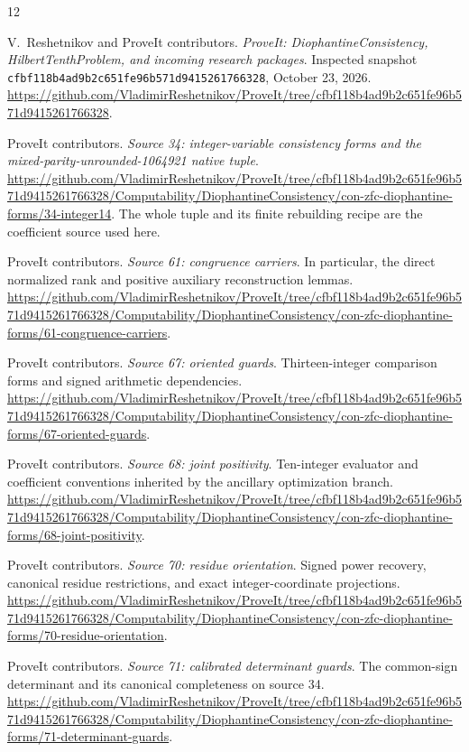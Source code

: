 \documentclass[11pt]{article}
\theoremstyle{definition}
\theoremstyle{remark}
\newcommand{\pin}{\nolinkurl{cfbf118b4ad9b2c651fe96b571d9415261766328}}
\begin{document}
\begin{thebibliography}{12}
\raggedright

V.~Reshetnikov and ProveIt contributors.
\emph{ProveIt: DiophantineConsistency, HilbertTenthProblem, and incoming
research packages}. Inspected snapshot
\pin, October 23, 2026.
\url{https://github.com/VladimirReshetnikov/ProveIt/tree/cfbf118b4ad9b2c651fe96b571d9415261766328}.

ProveIt contributors.
\emph{Source 34: integer-variable consistency forms and the
mixed-parity-unrounded-1064921 native tuple}.
\url{https://github.com/VladimirReshetnikov/ProveIt/tree/cfbf118b4ad9b2c651fe96b571d9415261766328/Computability/DiophantineConsistency/con-zfc-diophantine-forms/34-integer14}.
The whole tuple and its finite rebuilding recipe are the coefficient
source used here.

ProveIt contributors.
\emph{Source 61: congruence carriers}.
In particular, the direct normalized rank and positive auxiliary
reconstruction lemmas.
\url{https://github.com/VladimirReshetnikov/ProveIt/tree/cfbf118b4ad9b2c651fe96b571d9415261766328/Computability/DiophantineConsistency/con-zfc-diophantine-forms/61-congruence-carriers}.

ProveIt contributors.
\emph{Source 67: oriented guards}.
Thirteen-integer comparison forms and signed arithmetic dependencies.
\url{https://github.com/VladimirReshetnikov/ProveIt/tree/cfbf118b4ad9b2c651fe96b571d9415261766328/Computability/DiophantineConsistency/con-zfc-diophantine-forms/67-oriented-guards}.

ProveIt contributors.
\emph{Source 68: joint positivity}.
Ten-integer evaluator and coefficient conventions inherited by the
ancillary optimization branch.
\url{https://github.com/VladimirReshetnikov/ProveIt/tree/cfbf118b4ad9b2c651fe96b571d9415261766328/Computability/DiophantineConsistency/con-zfc-diophantine-forms/68-joint-positivity}.

ProveIt contributors.
\emph{Source 70: residue orientation}.
Signed power recovery, canonical residue restrictions, and exact
integer-coordinate projections.
\url{https://github.com/VladimirReshetnikov/ProveIt/tree/cfbf118b4ad9b2c651fe96b571d9415261766328/Computability/DiophantineConsistency/con-zfc-diophantine-forms/70-residue-orientation}.

ProveIt contributors.
\emph{Source 71: calibrated determinant guards}.
The common-sign determinant and its canonical completeness on source 34.
\url{https://github.com/VladimirReshetnikov/ProveIt/tree/cfbf118b4ad9b2c651fe96b571d9415261766328/Computability/DiophantineConsistency/con-zfc-diophantine-forms/71-determinant-guards}.


\end{thebibliography}
\end{document}
